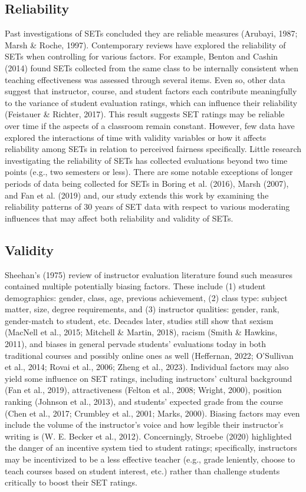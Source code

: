 \documentclass[
  man]{apa7}
\begin{document}
\subsection{Reliability}\label{reliability}

Past investigations of SETs concluded they are reliable measures
(Arubayi, 1987; Marsh \& Roche, 1997). Contemporary reviews have explored the
reliability of SETs when controlling for various factors. For example,
Benton and Cashin (2014) found SETs collected from the same class to be internally
consistent when teaching effectiveness was assessed through several
items. Even so, other data suggest that instructor, course, and student
factors each contribute meaningfully to the variance of student
evaluation ratings, which can influence their reliability
(Feistauer \& Richter, 2017). This result suggests SET ratings may be reliable over
time if the aspects of a classroom remain constant. However, few data
have explored the interactions of time with validity variables or how it
affects reliability among SETs in relation to perceived fairness
specifically. Little research investigating the reliability of SETs has
collected evaluations beyond two time points (e.g., two semesters or
less). There are some notable exceptions of longer periods of data being
collected for SETs in Boring et al. (2016), Marsh (2007), and Fan et al. (2019) and, our study extends this work by examining the reliability patterns of 30 years of SET data with respect to various moderating influences that may affect both reliability and validity of SETs.

\subsection{Validity}\label{validity}

Sheehan's (1975) review of instructor evaluation literature found such measures contained multiple potentially biasing factors. These include (1) student demographics: gender, class, age,
previous achievement, (2) class type: subject matter, size, degree
requirements, and (3) instructor qualities: gender, rank, gender-match to
student, etc. Decades later, studies still show that sexism
(MacNell et al., 2015; Mitchell \& Martin, 2018), racism (Smith \& Hawkins, 2011), and biases in general
pervade students' evaluations today in both traditional courses and
possibly online ones as well (Heffernan, 2022; O'Sullivan et al., 2014; Rovai et al., 2006; Zheng et al., 2023). Individual factors may also yield some influence on SET
ratings, including instructors' cultural background (Fan et al., 2019),
attractiveness (Felton et al., 2008; Wright, 2000), position ranking
(Johnson et al., 2013), and students' expected grade from the course (Chen et al., 2017; Crumbley et al., 2001; Marks, 2000). Biasing factors may even include the volume
of the instructor's voice and how legible their instructor's writing is
(W. E. Becker et al., 2012). Concerningly, Stroebe (2020) highlighted the danger of an incentive system tied to student ratings; specifically, instructors may be incentivized to be a less effective teacher (e.g., grade leniently, choose to teach courses based on student interest, etc.) rather than challenge students critically to boost their SET ratings.
\end{document}
